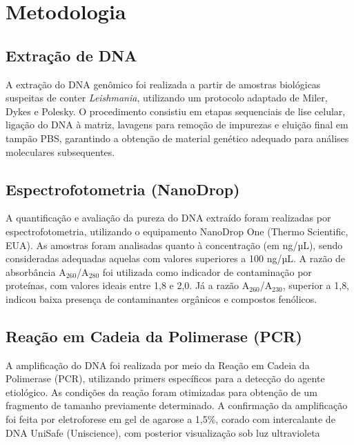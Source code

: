 \section{Metodologia}

\subsection{Extração de DNA}

A extração do DNA genômico foi realizada a partir de amostras biológicas
suspeitas de conter \textit{Leishmania}, utilizando um protocolo adaptado de
Miler, Dykes e Polesky\cite{SODEmiller1988}.  O procedimento consistiu em
etapas sequenciais de lise celular, ligação do DNA à matriz, lavagens para
remoção de impurezas e eluição final em tampão PBS, garantindo a obtenção de
material genético adequado para análises moleculares subsequentes.

\subsection{Espectrofotometria (NanoDrop)}

A quantificação e avaliação da pureza do DNA extraído foram realizadas por
espectrofotometria, utilizando o equipamento NanoDrop One (Thermo Scientific,
EUA). As amostras foram analisadas quanto à concentração (em ng/µL), sendo
consideradas adequadas aquelas com valores superiores a 100 ng/µL. A razão de
absorbância A$_{260}$/A$_{280}$ foi utilizada como indicador de contaminação por
proteínas, com valores ideais entre 1{,}8 e 2{,}0. Já a razão
A$_{260}$/A$_{230}$, superior a 1{,}8, indicou baixa presença de contaminantes
orgânicos e compostos fenólicos.

\subsection{Reação em Cadeia da Polimerase (PCR)}

A amplificação do DNA foi realizada por meio da Reação em Cadeia da Polimerase
(PCR), utilizando primers específicos para a detecção do agente etiológico. As
condições da reação foram otimizadas para obtenção de um fragmento de tamanho
previamente determinado. A confirmação da amplificação foi feita por
eletroforese em gel de agarose a 1,5\%, corado com intercalante de DNA UniSafe
(Uniscience), com posterior visualização sob luz ultravioleta

